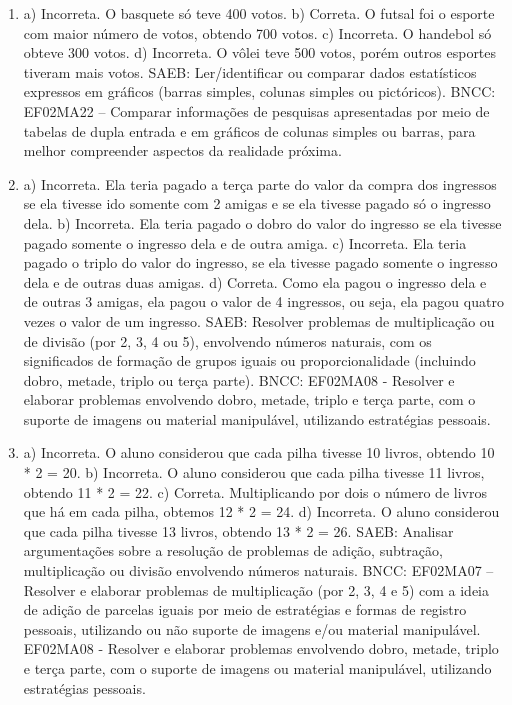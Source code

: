 \begin{enumerate}
\item
a) Incorreta. O basquete só teve 400 votos.
b) Correta. O futsal foi o esporte com maior número de votos, obtendo 700 votos.
c) Incorreta. O handebol só obteve 300 votos.
d) Incorreta. O vôlei teve 500 votos, porém outros esportes tiveram mais votos.
SAEB: Ler/identificar ou comparar dados estatísticos expressos
em gráficos (barras simples, colunas simples ou pictóricos).
BNCC: EF02MA22 -- Comparar informações de pesquisas apresentadas por meio
de tabelas de dupla entrada e em gráficos de colunas simples ou barras,
para melhor compreender aspectos da realidade próxima.

\item
a) Incorreta. Ela teria pagado a terça parte do valor da compra dos ingressos se ela
tivesse ido somente com 2 amigas e se ela tivesse pagado só o ingresso
dela.
b) Incorreta. Ela teria pagado o dobro do valor do ingresso se ela
tivesse pagado somente o ingresso dela e de outra amiga.
c) Incorreta. Ela teria pagado o triplo do valor do ingresso, se ela
tivesse pagado somente o ingresso dela e de outras duas amigas.
d) Correta. Como ela pagou o ingresso dela e de outras 3 amigas, ela
pagou o valor de 4 ingressos, ou seja, ela pagou quatro vezes o valor de um ingresso.
SAEB: Resolver problemas de multiplicação ou de divisão (por 2,
3, 4 ou 5), envolvendo números naturais, com os significados de formação
de grupos iguais ou proporcionalidade (incluindo dobro, metade, triplo
ou terça parte).
BNCC: EF02MA08 - Resolver e elaborar
problemas envolvendo dobro, metade, triplo e terça parte, com o suporte de imagens ou material manipulável, utilizando estratégias pessoais.

\item
a) Incorreta. O aluno considerou que cada pilha tivesse 10 livros, obtendo 10 * 2 = 20.
b) Incorreta. O aluno considerou que cada pilha tivesse 11 livros, obtendo 11 * 2 = 22.
c) Correta. Multiplicando por dois o número de livros que há em cada pilha, obtemos 12 * 2 = 24.
d) Incorreta. O aluno considerou que cada pilha tivesse 13 livros, obtendo 13 * 2 = 26.
SAEB: Analisar argumentações sobre a resolução de problemas de
adição, subtração, multiplicação ou divisão envolvendo números naturais.
BNCC: EF02MA07 -- Resolver e elaborar problemas de multiplicação (por 2,
3, 4 e 5) com a ideia de adição de parcelas iguais por meio de
estratégias e formas de registro pessoais, utilizando ou não suporte de
imagens e/ou material manipulável. EF02MA08 - Resolver e elaborar
problemas envolvendo dobro, metade, triplo e terça parte, com o suporte
de imagens ou material manipulável, utilizando estratégias pessoais.
\end{enumerate}

